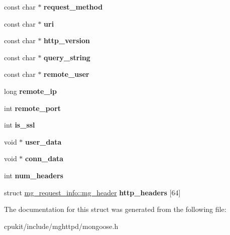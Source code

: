 \begin{DoxyCompactItemize}
\item 
\mbox{\label{structmg__request__info_a70b531b329bd93e4850c2544893fa9a8}} 
const char $\ast$ {\bfseries request\+\_\+method}
\item 
\mbox{\label{structmg__request__info_a964abf9c5032ba40f9bb9850b440165a}} 
const char $\ast$ {\bfseries uri}
\item 
\mbox{\label{structmg__request__info_ac9743ffd7a96d700813777ff3d3bc25d}} 
const char $\ast$ {\bfseries http\+\_\+version}
\item 
\mbox{\label{structmg__request__info_a918f473c007e03c3f4ac3a35af8c22f5}} 
const char $\ast$ {\bfseries query\+\_\+string}
\item 
\mbox{\label{structmg__request__info_aea0e44be08a00a1ce0f2a08d034d9c8a}} 
const char $\ast$ {\bfseries remote\+\_\+user}
\item 
\mbox{\label{structmg__request__info_a0c12466ebcbbd41e2e1886e39799c5ab}} 
long {\bfseries remote\+\_\+ip}
\item 
\mbox{\label{structmg__request__info_af2a549c0b1db3ab0a0efe7861cc62e6a}} 
int {\bfseries remote\+\_\+port}
\item 
\mbox{\label{structmg__request__info_af66a6c4c2364a37b87f646f76b9e7d3d}} 
int {\bfseries is\+\_\+ssl}
\item 
\mbox{\label{structmg__request__info_a383d55fab7d885a52cfa9c8a56f2a7c3}} 
void $\ast$ {\bfseries user\+\_\+data}
\item 
\mbox{\label{structmg__request__info_aad3d4e3de727f7424ff7526ed085716e}} 
void $\ast$ {\bfseries conn\+\_\+data}
\item 
\mbox{\label{structmg__request__info_afcdf69ee822fd9786f3e30c6d10b192a}} 
int {\bfseries num\+\_\+headers}
\item 
\mbox{\label{structmg__request__info_ac62dca1d3ac0c60a06a0b15262f16371}} 
struct \mbox{\hyperlink{structmg__request__info_1_1mg__header}{mg\+\_\+request\+\_\+info\+::mg\+\_\+header}} {\bfseries http\+\_\+headers} \mbox{[}64\mbox{]}
\end{DoxyCompactItemize}


The documentation for this struct was generated from the following file\+:\begin{DoxyCompactItemize}
\item 
cpukit/include/mghttpd/mongoose.\+h\end{DoxyCompactItemize}
